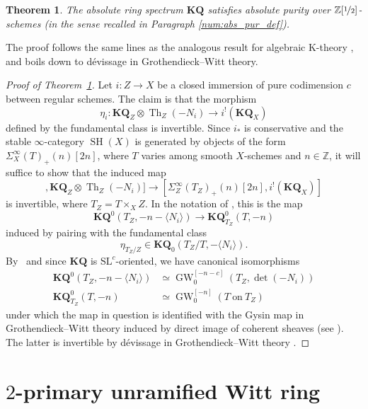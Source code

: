 \documentclass[JEP,XML,SOM,Unicode]{cedram}
\DeclareMathOperator{\GW}{GW}
\newcommand{\KQ}{\mathbf{KQ}}
\newcommand{\SL}{\mathrm{SL}}
\newcommand{\vb}[1]{\langle#1\rangle}
\DeclareMathOperator{\SH}{SH}
\DeclareMathOperator{\Th}{Th}
\newcommand{\ZZ} {\mathbb Z}
\newcommand{\ZZot} {\mathbb Z[\nicefrac 1 2]}
\newtheorem{thm}{Theorem}[section]
\theoremstyle{remark}
\theoremstyle{definition}
\numberwithin{equation}{thm}
\begin{document}
\begin{thm}\label{thm:abs_purity_KQ}
The absolute ring spectrum $\KQ$ satisfies absolute purity over $\ZZot$-schemes (in the sense recalled in Paragraph \ref{num:abs_pur_def}).
\end{thm}

The proof follows the same lines as the analogous result for algebraic K-theory \cite[Th.\,13.6.3]{CD3}, and boils down to dévissage in Grothendieck--Witt theory.

\begin{proof}[Proof of Theorem~\ref{thm:abs_purity_KQ}]
Let $i:Z\to X$ be a closed immersion of pure codimension $c$ between regular schemes.
The claim is that the morphism
\[
\eta_i : \KQ_Z \otimes \Th_Z(-N_i) \to i^!(\KQ_X)
\]
defined by the fundamental class is invertible.
Since $i_*$ is conservative and the stable $\infty$-category $\SH(X)$ is generated by objects of the form $\Sigma^\infty_X(T)_+(n)[2n]$, where $T$ varies among smooth $X$-schemes and $n\in\ZZ$, it will suffice to show that the induced map
\begin{equation*}
[\Sigma^\infty_Z(T_Z)_+(n)[2n],\KQ_Z\otimes\Th_Z(-N_i)]
\to [\Sigma^\infty_Z(T_Z)_+(n)[2n],i^!(\KQ_X)]
\end{equation*}
is invertible, where $T_Z = T\times_X Z$.
In the notation of \cite{DJK}, this is the map
\begin{equation*}
\KQ^0(T_Z, -n-\vb{N_i}) \to \KQ^0_{T_Z}(T, -n)
\end{equation*}
induced by pairing with the fundamental class
\[
\eta_{T_Z/Z} \in \KQ_0(T_Z/T, -\vb{N_i}).
\]
By~\cite[Cor.\,7.3]{PaninWalter1} and since $\KQ$ is $\SL^c$-oriented, we have canonical isomorphisms
\begin{align*}
\KQ^0(T_Z, -n-\vb{N_i}) &\simeq \GW_{0}^{[-n-c]}(T_Z, \det(-N_i))\\
\KQ^0_{T_Z}(T, -n) &\simeq \GW_{0}^{[-n]}(T~\text{on}~T_Z)
\end{align*}
under which the map in question is identified with the Gysin map in Grothendieck--Witt theory induced by direct image of coherent sheaves (see \cite[(9.9)]{Schlicht2}).
The latter is invertible by dévissage in Grothendieck--Witt theory \cite[Th.\,9.5, 9.18 \& 9.19]{Schlicht2}.
\end{proof}

\section{\texorpdfstring{$2$}{2}-primary unramified Witt ring}
\label{apd:W}
\end{document}
